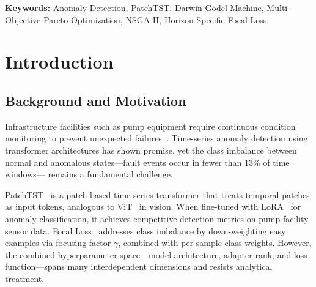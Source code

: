 ﻿\documentclass[twocolumn]{article}
\begin{document}
\begin{abstract}
Building on these fixed values, we further propose
\textbf{Horizon-Specific 9D DGM}: each forecast horizon
$h \in \{30,60,90\}\,\mathrm{d}$ receives independent Focal Loss
parameters $(\alpha_h, \gamma_h, w_{n,h})$, subject to the
per-horizon normalisation constraint $w_{n,h}+w_{a,h}=W_\mathrm{sum}$.
This design decouples the inherently different loss landscapes of
short-, medium-, and long-range prediction.
Systematic 4D$\to$6D$\to$8D ablation studies confirm that the
phased approach outperforms full joint search by 12.0 points in
macro-F1 (0.776 vs.\ 0.656), validating the structural decomposition.
A transferable finding also emerges: $\alpha_L/r \approx 2.9$ is a stable LoRA scaling law independent
of search dimensionality.
Under this stable LoRA condition, the focal loss and class-weight parameter subspace
can be effectively optimized to improve horizon-specific anomaly detection performance.
This horizon-specific loss design enables tailored 3D optimization under the class-weight-sum constraint 
for each of the triple forecast horizons, enhancing detection accuracy across short-, medium-, and long-range predictions.
\end{abstract}

\noindent
\textbf{Keywords:} Anomaly Detection, PatchTST, Darwin-G\"{o}del Machine,
Multi-Objective Pareto Optimization, NSGA-II, Horizon-Specific Focal Loss.

\section{Introduction}
\label{sec:intro}

\subsection{Background and Motivation}

Infrastructure facilities such as pump equipment require continuous
condition monitoring to prevent unexpected failures~\cite{mlit2023bridge}.
Time-series anomaly detection using transformer architectures has
shown promise, yet the class imbalance between normal and anomalous
states---fault events occur in fewer than 13\% of time windows---
remains a fundamental challenge.

PatchTST~\cite{nie2023patchtst} is a patch-based time-series
transformer that treats temporal patches as input tokens,
analogous to ViT~\cite{dosovitskiy2020vit} in vision.
When fine-tuned with LoRA~\cite{hu2022lora} for anomaly classification,
it achieves competitive detection metrics on pump-facility sensor data.
Focal Loss~\cite{lin2017focal} addresses class imbalance by
down-weighting easy examples via focusing factor $\gamma$,
combined with per-sample class weights.
However, the combined hyperparameter space---model architecture,
adapter rank, and loss function---spans many interdependent dimensions
and resists analytical treatment.
\end{document}
